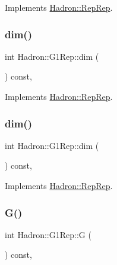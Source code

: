 Implements \mbox{\hyperlink{structHadron_1_1RepRep_a92c8802e5ed7afd7da43ccfd5b7cd92b}{Hadron\+::\+Rep\+Rep}}.

\mbox{\label{structHadron_1_1G1Rep_ab5e3b558f74546bd0c29b5a913aca993}} 
\subsubsection{\texorpdfstring{dim()}{dim()}\hspace{0.1cm}{\footnotesize\ttfamily [4/5]}}
{\footnotesize\ttfamily int Hadron\+::\+G1\+Rep\+::dim (\begin{DoxyParamCaption}{ }\end{DoxyParamCaption}) const\hspace{0.3cm}{\ttfamily [inline]}, {\ttfamily [virtual]}}



Implements \mbox{\hyperlink{structHadron_1_1RepRep_a92c8802e5ed7afd7da43ccfd5b7cd92b}{Hadron\+::\+Rep\+Rep}}.

\mbox{\label{structHadron_1_1G1Rep_ab5e3b558f74546bd0c29b5a913aca993}} 
\subsubsection{\texorpdfstring{dim()}{dim()}\hspace{0.1cm}{\footnotesize\ttfamily [5/5]}}
{\footnotesize\ttfamily int Hadron\+::\+G1\+Rep\+::dim (\begin{DoxyParamCaption}{ }\end{DoxyParamCaption}) const\hspace{0.3cm}{\ttfamily [inline]}, {\ttfamily [virtual]}}



Implements \mbox{\hyperlink{structHadron_1_1RepRep_a92c8802e5ed7afd7da43ccfd5b7cd92b}{Hadron\+::\+Rep\+Rep}}.

\mbox{\label{structHadron_1_1G1Rep_aef0192ff8fe84fbb599253d0b499cc48}} 
\subsubsection{\texorpdfstring{G()}{G()}\hspace{0.1cm}{\footnotesize\ttfamily [1/3]}}
{\footnotesize\ttfamily int Hadron\+::\+G1\+Rep\+::G (\begin{DoxyParamCaption}{ }\end{DoxyParamCaption}) const\hspace{0.3cm}{\ttfamily [inline]}, {\ttfamily [virtual]}}

